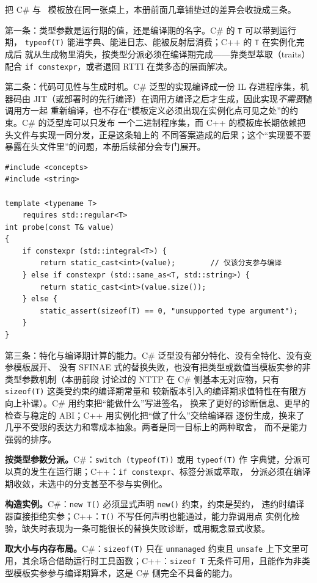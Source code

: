\documentclass[12pt,a4paper,fontset=fandol]{ctexbook}
\newcommand{\cpplabel}{%
  \tcbox[on line,colback=cppheadbg,colframe=cppheadbg,
    boxrule=0pt,arc=1pt,left=2pt,right=2pt,top=1pt,bottom=1pt,
    colupper=white,fontupper=\scriptsize\bfseries]{C++}}
\newcommand{\cpp}[1]{C++#1}
\newcommand{\kw}[1]{\texttt{#1}}
\begin{document}
把 C\# 与 \cpplabel\ 模板放在同一张桌上，本册前面几章铺垫过的差异会收拢成三条。

第一条：类型参数是运行期的值，还是编译期的名字。C\# 的 \kw{T} 可以带到运行期，
\kw{typeof(T)} 能进字典、能进日志、能被反射层消费；\cpp{} 的 \kw{T} 在实例化完成后
就从生成物里消失，按类型分派必须在编译期完成——靠类型萃取（traits）配合
\kw{if constexpr}，或者退回 RTTI 在类多态的层面解决。

第二条：代码可见性与生成时机。C\# 泛型的实现编译成一份 IL 存进程序集，机器码由
JIT（或部署时的先行编译）在调用方编译之后才生成，因此实现\emph{不需要}随调用方一起
重新编译，也不存在“模板定义必须出现在实例化点可见之处”的约束。C\# 的泛型库可以只发布
一个二进制程序集，而 \cpp{} 的模板库长期依赖把头文件与实现一同分发，正是这条轴上的
不同答案造成的后果；这个“实现要不要暴露在头文件里”的问题，本册后续部分会专门展开。

\begin{lstlisting}[style=cppstyle,caption={同一需求在 C++ 里的写法：分派发生在编译期}]
#include <concepts>
#include <string>

template <typename T>
    requires std::regular<T>
int probe(const T& value)
{
    if constexpr (std::integral<T>) {
        return static_cast<int>(value);        // 仅该分支参与编译
    } else if constexpr (std::same_as<T, std::string>) {
        return static_cast<int>(value.size());
    } else {
        static_assert(sizeof(T) == 0, "unsupported type argument");
    }
}
\end{lstlisting}

第三条：特化与编译期计算的能力。C\# 泛型没有部分特化、没有全特化、没有变参模板展开、
没有 SFINAE 式的替换失败，也没有把类型或数值当模板实参的非类型参数机制（本册前段
讨论过的 NTTP 在 C\# 侧基本无对应物，只有 \kw{sizeof(T)} 这类受约束的编译期常量和
较新版本引入的编译期求值特性在有限方向上补课）。C\# 用约束把“能做什么”写进签名，
换来了更好的诊断信息、更早的检查与稳定的 ABI；\cpp{} 用实例化把“做了什么”交给编译器
逐份生成，换来了几乎不受限的表达力和零成本抽象。两者是同一目标上的两种取舍，
而不是能力强弱的排序。

\begin{compare}[title={同一需求，两问两答}]
\textbf{按类型参数分派。}C\#：\kw{switch (typeof(T))} 或用 \kw{typeof(T)} 作
字典键，分派可以真的发生在运行期；\cpp{}：\kw{if constexpr}、标签分派或萃取，
分派必须在编译期收敛，未选中的分支甚至不参与实例化。

\textbf{构造实例。}C\#：\kw{new T()} 必须显式声明 \kw{new()} 约束，约束是契约，
违约时编译器直接拒绝实参；\cpp{}：\kw{T()} 不写任何声明也能通过，能力靠调用点
实例化检验，缺失时表现为一条可能很长的替换失败诊断，或用概念显式收紧。

\textbf{取大小与内存布局。}C\#：\kw{sizeof(T)} 只在 \kw{unmanaged} 约束且
\kw{unsafe} 上下文里可用，其余场合借助运行时工具函数；\cpp{}：\kw{sizeof T}
无条件可用，且能作为非类型模板实参参与编译期算术，这是 C\# 侧完全不具备的能力。
\end{compare}
\end{document}
